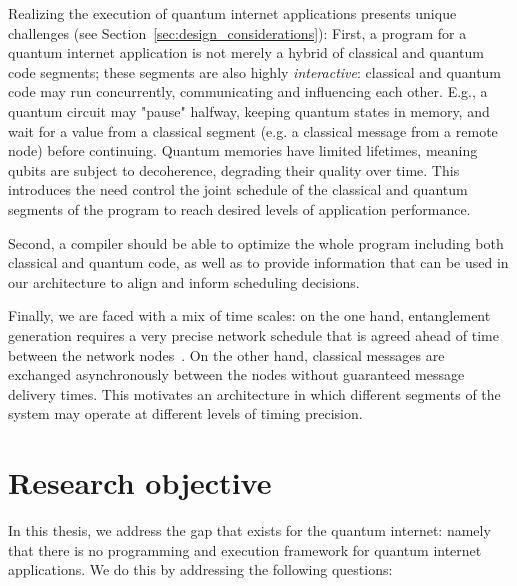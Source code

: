 Realizing the execution of quantum internet applications presents unique challenges (see Section~\ref{sec:design_considerations}): 
First, a program for a quantum internet application is not merely a hybrid of classical and quantum code segments; these segments are also highly \textit{interactive}: classical and quantum code may run concurrently, communicating and influencing each other.
E.g., a quantum circuit may "pause" halfway, keeping quantum states in memory, and wait for a value from a classical segment (e.g. a classical message from a remote node) before continuing.
Quantum memories have limited lifetimes, meaning qubits are subject to decoherence, degrading their quality over time. This introduces the need 
control the joint schedule of the classical and quantum segments of the program to reach desired levels of application performance.

Second, a compiler should be able to optimize the whole program including both classical and quantum code, as well as to provide information that can be used in our architecture to align and inform scheduling decisions. 

Finally, we are faced with a mix of time scales:
on the one hand, entanglement generation requires a very precise network schedule that is agreed ahead of time between the network nodes~\cite{dahlberg2019link}. On the other hand, classical messages are exchanged asynchronously between the nodes without guaranteed message delivery times. This motivates an architecture in which different segments of the system may operate at different levels of timing precision. 

\section{Research objective}
In this thesis, we address the gap that exists for the quantum internet: namely that there is no programming and execution framework for quantum internet applications.
We do this by addressing the following questions:

